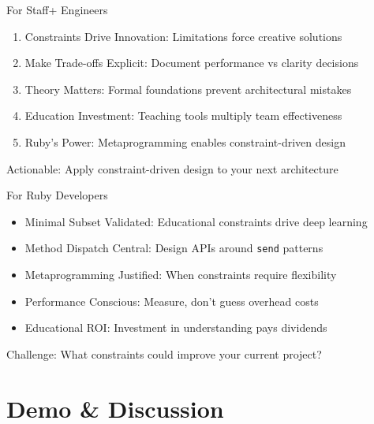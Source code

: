 \documentclass[presentation,aspectratio=169]{beamer}
\begin{document}
\begin{frame}[label={sec:org6a7ac8e}]{For Staff+ Engineers}
\begin{enumerate}[<+->]
\item \alert{Constraints Drive Innovation}: Limitations force creative solutions
\item \alert{Make Trade-offs Explicit}: Document performance vs clarity decisions
\item \alert{Theory Matters}: Formal foundations prevent architectural mistakes
\item \alert{Education Investment}: Teaching tools multiply team effectiveness
\item \alert{Ruby's Power}: Metaprogramming enables constraint-driven design
\end{enumerate}

\pause

\alert{Actionable}: Apply constraint-driven design to your next architecture
\end{frame}
\begin{frame}[label={sec:org53899b2},fragile]{For Ruby Developers}
 \begin{itemize}[<+->]
\item \alert{Minimal Subset Validated}: Educational constraints drive deep learning
\item \alert{Method Dispatch Central}: Design APIs around \texttt{send} patterns
\item \alert{Metaprogramming Justified}: When constraints require flexibility
\item \alert{Performance Conscious}: Measure, don't guess overhead costs
\item \alert{Educational ROI}: Investment in understanding pays dividends
\end{itemize}

\pause

\alert{Challenge}: What constraints could improve your current project?
\end{frame}
\section{Demo \& Discussion}
\label{sec:orgca2646b}
\end{document}
